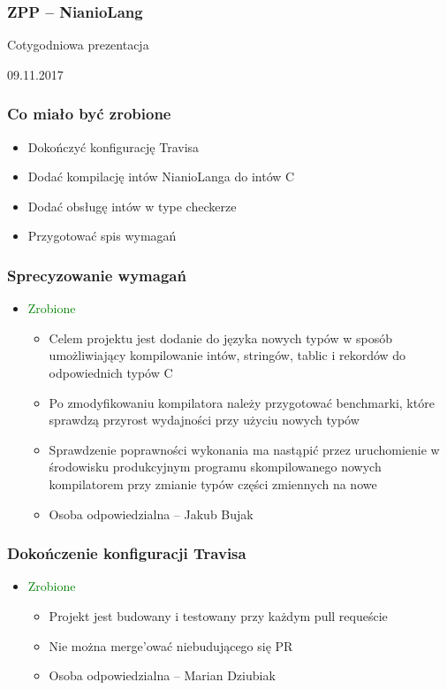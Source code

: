 \documentclass{beamer}
\begin{document}
	\begin{frame}
		\frametitle{ZPP -- NianioLang}
		Cotygodniowa prezentacja
		
		09.11.2017
	\end{frame}
	
	\begin{frame}
		\frametitle{Co miało być zrobione}
		\begin{itemize}
		 \item Dokończyć konfigurację Travisa
		 \item Dodać kompilację intów NianioLanga do intów C
		 \item Dodać obsługę intów w type checkerze
		 \item Przygotować spis wymagań
		\end{itemize}
	\end{frame}
	
	\begin{frame}
		\frametitle{Sprecyzowanie wymagań}
		\begin{itemize}
			\item\textcolor{green}{Zrobione}
			\begin{itemize}
				\item Celem projektu jest dodanie do języka nowych typów w sposób umożliwiający kompilowanie
				intów, stringów, tablic i rekordów do odpowiednich typów C
				\item Po zmodyfikowaniu kompilatora należy przygotować benchmarki, które sprawdzą przyrost wydajności
				przy użyciu nowych typów
				\item Sprawdzenie poprawności wykonania ma nastąpić przez uruchomienie w środowisku produkcyjnym
				programu skompilowanego nowych kompilatorem przy zmianie typów części zmiennych na nowe
				\item Osoba odpowiedzialna -- Jakub Bujak
			\end{itemize}
		\end{itemize}
	\end{frame}
	
	\begin{frame}
		\frametitle{Dokończenie konfiguracji Travisa}
		\begin{itemize}
			\item\textcolor{green}{Zrobione}
			\begin{itemize}
				\item Projekt jest budowany i testowany przy każdym pull requeście
				\item Nie można merge'ować niebudującego się PR
				\item Osoba odpowiedzialna -- Marian Dziubiak
			\end{itemize}
		\end{itemize}
	\end{frame}
	
\end{document}
